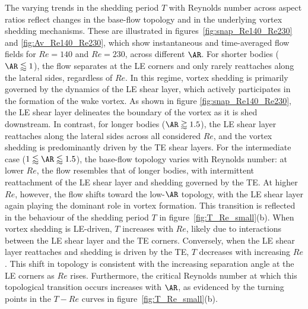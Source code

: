 The varying trends in the shedding period $T$ with Reynolds number across aspect ratios reflect changes in the base-flow topology and in the underlying vortex shedding mechanisms. These are illustrated in figures~\ref{fig:snap_Re140_Re230} and \ref{fig:Av_Re140_Re230}, which show instantaneous and time-averaged flow fields for $Re=140$ and $Re=230$, across different $\AR$.
%
For shorter bodies ($\AR \lessapprox 1$), the flow separates at the LE corners and only rarely reattaches along the lateral sides, regardless of $Re$. In this regime, vortex shedding is primarily governed by the dynamics of the LE shear layer, which actively participates in the formation of the wake vortex. As shown in figure \ref{fig:snap_Re140_Re230}, the LE shear layer delineates the boundary of the vortex as it is shed downstream.
%
In contrast, for longer bodies ($\AR \gtrapprox 1.5$), the LE shear layer reattaches along the lateral sides across all considered $Re$, and the vortex shedding is predominantly driven by the TE shear layers. For the intermediate case ($1 \lessapprox \AR \lessapprox 1.5$), the base-flow topology varies with Reynolds number: at lower $Re$, the flow resembles that of longer bodies, with intermittent reattachment of the LE shear layer and shedding governed by the TE. At higher $Re$, however, the flow shifts toward the low-$\AR$ topology, with the LE shear layer again playing the dominant role in vortex formation.
%
This transition is reflected in the behaviour of the shedding period $T$ in figure~\ref{fig:T_Re_small}(b). When vortex shedding is LE-driven, $T$ increases with $Re$, likely due to interactions between the LE shear layer and the TE corners. Conversely, when the LE shear layer reattaches and shedding is driven by the TE, $T$ decreases with increasing $Re$. This shift in topology is consistent with the increasing separation angle at the LE corners as $Re$ rises. Furthermore, the critical Reynolds number at which this topological transition occurs increases with $\AR$, as evidenced by the turning points in the $T-Re$ curves in figure~\ref{fig:T_Re_small}(b).

